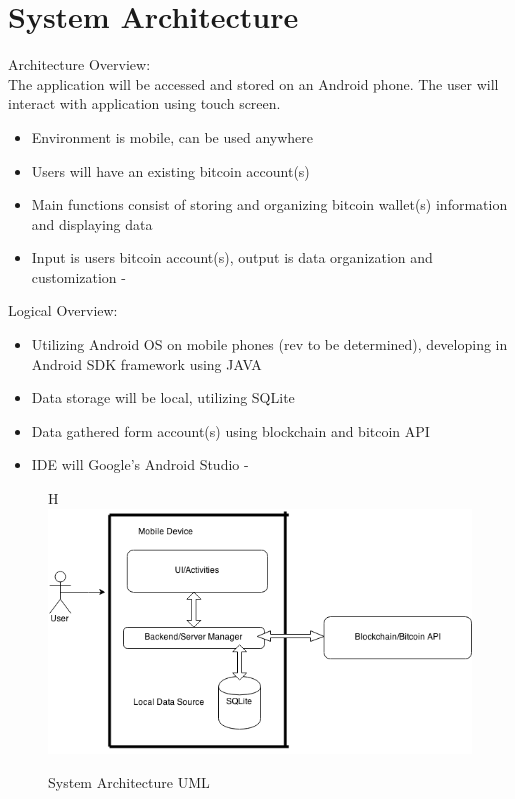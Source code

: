 \section{System Architecture}

Architecture Overview:\\
The application will be accessed and stored on an Android phone.  The user will interact with application using touch screen.\\
\begin{itemize}
\item Environment is mobile, can be used anywhere 
\item Users will have an existing bitcoin account(s)
\item Main functions consist of storing and organizing bitcoin wallet(s) information and displaying data
\item Input is users bitcoin account(s), output is data organization and customization
-\end{itemize}

Logical Overview:\\
\begin{itemize}
\item Utilizing Android OS on mobile phones (rev to be determined), developing in Android SDK framework using JAVA
\item Data storage will be local, utilizing SQLite
\item Data gathered form account(s) using blockchain and bitcoin API
\item IDE will Google's Android Studio
-\end{itemize}

\begin{figure}{H}
	\centering
	\includegraphics[scale=0.5]{../diagrams/systemArch.png}
	\caption{System Architecture UML}
	\end{figure}
	
